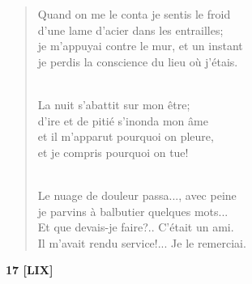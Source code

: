 \documentclass[a4paper,12pt]{book}
\begin{document}
\begin{verse}
Quand on me le conta je sentis le froid \\
d'une lame d'acier dans les entrailles; \\
je m'appuyai contre le mur, et un instant \\
je perdis la conscience du lieu où j'étais. \\ \

La nuit s'abattit sur mon être; \\
d'ire et de pitié s'inonda mon âme \\
et il m'apparut pourquoi on pleure, \\
et je compris pourquoi on tue! \\ \

Le nuage de douleur passa..., avec peine \\
je parvins à balbutier quelques mots... \\
Et que devais-je faire?.. C'était un ami. \\
Il m'avait rendu service!... Je le remerciai. \\
\end{verse}

\bigskip

\begin{center} {\bf 17 [LIX]} \end{center}
\end{document}
